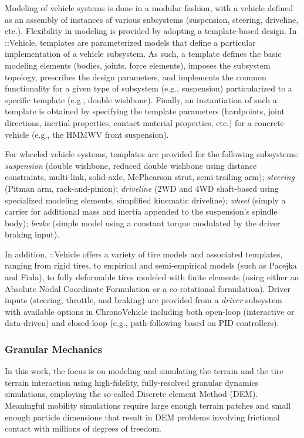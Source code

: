 \documentclass[12pt,twocolumn]{article}
\newcommand{\CHRONO}{{\sffamily{{Chrono}}}}
\newcommand{\ChronoVehicle}{{\sffamily{Chrono}}::Vehicle}
\begin{document}
Modeling of vehicle systems is done in a modular fashion, with a vehicle defined as an assembly of instances of various subsystems (suspension, steering, driveline, etc.).  Flexibility in modeling is provided by adopting a template-based design. In {\ChronoVehicle}, templates are parameterized models that define a particular implementation of a vehicle subsystem. As such, a template defines the basic modeling elements (bodies, joints, force elements), imposes the subsystem topology, prescribes the design parameters, and implements the common functionality for a given type of subsystem (e.g., suspension) particularized to a specific template (e.g., double wishbone). Finally, an instantiation of such a template is obtained by specifying the template parameters (hardpoints, joint directions, inertial properties, contact material properties, etc.) for a concrete vehicle (e.g., the HMMWV front suspension).

For wheeled vehicle systems, templates are provided for the following subsystems:
{\em suspension} (double wishbone, reduced double wishbone using distance constraints, multi-link, solid-axle, McPhearson strut, semi-trailing arm);
{\em steering} (Pitman arm, rack-and-pinion);
{\em driveline} (2WD and 4WD shaft-based using specialized {\CHRONO} modeling elements, simplified kinematic driveline);
{\em wheel} (simply a carrier for additional mass and inertia appended to the suspension's spindle body);
{\em brake} (simple model using a constant torque modulated by the driver braking input).

In addition, {\ChronoVehicle} offers a variety of tire models and associated templates, ranging from rigid tires, to empirical and semi-empirical models (such as Pacejka and Fiala), to fully deformable tires modeled with finite elements (using either an Absolute Nodal Coordinate Formulation or a co-rotational formulation).  Driver inputs (steering, throttle, and braking) are provided from a {\em driver} subsystem with available options in {ChronoVehicle} including both open-loop (interactive or data-driven) and closed-loop (e.g., path-following based on PID controllers).


\subsubsection{Granular Mechanics}\label{sss:GranMech}

In this work, the focus is on modeling and simulating the terrain and the tire-terrain interaction using high-fidelity, fully-resolved granular dynamics simulations, employing the so-called Discrete element Method (DEM).  Meaningful mobility simulations require large enough terrain patches and small enough particle dimensions that result in DEM problems involving frictional contact with millions of degrees of freedom.
\end{document}
